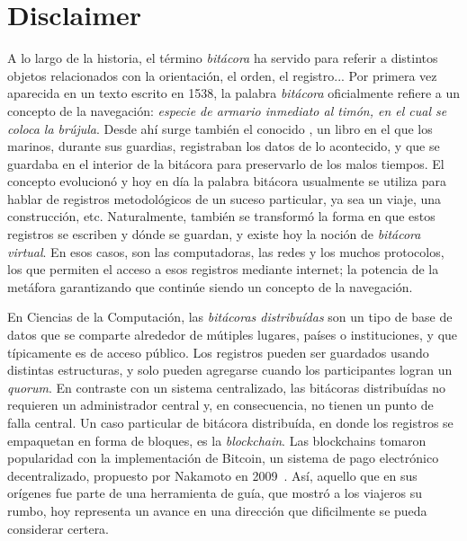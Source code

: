 \section{Disclaimer}


A lo largo de la historia, el término \textit{bitácora} ha servido para referir a
distintos objetos relacionados con la orientación, el orden, el registro... Por
primera vez aparecida en un texto escrito en 1538, la palabra \textit{bitácora}
oficialmente refiere a un concepto de la navegación: \textit{especie de armario
inmediato al timón, en el cual se coloca la brújula}. Desde ahí surge también
el conocido , un libro en el que los marinos, durante
sus guardias, registraban los datos de lo acontecido, y que se guardaba en el
interior de la bitácora para preservarlo de los malos tiempos. El concepto
evolucionó y hoy en día la palabra bitácora usualmente se utiliza para hablar
de registros metodológicos de un suceso particular, ya sea un viaje, una
construcción, etc. Naturalmente, también se transformó la forma en que estos
registros se escriben y dónde se guardan, y existe hoy la noción de \textit{bitácora
virtual}. En esos casos, son las computadoras, las redes y los muchos protocolos,
los que permiten el acceso a esos registros mediante internet; la potencia de la
metáfora garantizando que continúe siendo un concepto de la navegación.
%

En Ciencias de la Computación, las \textit{bitácoras distribuídas} son un tipo de
base de datos que se comparte
alrededor de mútiples lugares, países o instituciones, y que típicamente es de
acceso público. Los registros pueden ser guardados usando distintas estructuras,
y solo pueden agregarse cuando los participantes logran un \textit{quorum}. En
contraste con un sistema centralizado, las bitácoras distribuídas no requieren
un administrador central y, en consecuencia, no tienen un punto de falla central.
Un caso particular de bitácora distribuída, en donde los registros se empaquetan
en forma de bloques, es la \textit{blockchain}. Las blockchains tomaron popularidad
con la implementación de Bitcoin, un sistema de pago electrónico decentralizado, 
propuesto por Nakamoto en 2009~\cite{nakamoto06bitcoin}.
Así, aquello que en sus orígenes fue parte de una herramienta de guía, que mostró
a los viajeros su rumbo, hoy representa un avance en una dirección que dificilmente se
pueda considerar certera.

